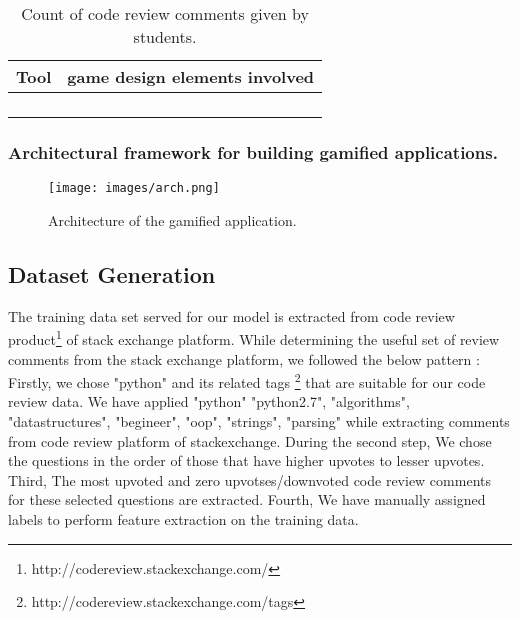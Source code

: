 \documentclass[conference]{IEEEtran}
\newcounter{magicrownumbers}
\newcommand\rownumber{\stepcounter{magicrownumbers}\arabic{magicrownumbers}}
\begin{document}
\begin{table}[ht]
\centering
\caption{Count of code review comments given by students.}
\begin{tabular}{|c|p{2cm}|c|} \hline
\multicolumn{2}{|c|}{Tool} & game design elements involved  \\ \hline
 \setcounter{magicrownumbers}{0}\rownumber & & \\
 \rownumber & & \\
 \rownumber & & \\
 \rownumber & & \\
 \hline
\end{tabular}
\label{tab:tools}
\end{table}

\subsubsection{Architectural framework for building gamified applications.}

\begin{figure}[ht]
\hspace{-6ex}
\centering
\texttt{[image: images/arch.png]}
\caption{Architecture of the gamified application.}
\label{fig:architecture}
\end{figure}

\subsection{Dataset Generation}
The training data set served for our model is extracted from code review product\footnote{http://codereview.stackexchange.com/} of stack exchange platform. While determining the useful set of review comments from the stack exchange platform, we followed the below pattern :
Firstly, we chose "python" and its related tags \footnote{http://codereview.stackexchange.com/tags} that are suitable for our code review data. We have applied "python" "python2.7", "algorithms", "datastructures", "begineer", "oop", "strings", "parsing" while extracting comments from code review platform of stackexchange. \newline During the second step, We chose the questions in the order of those that have higher upvotes to lesser upvotes. \newline Third, The most upvoted and zero upvotses/downvoted code review comments for these selected questions are extracted. \newline Fourth, We have manually assigned labels to perform feature extraction on the training data.
\end{document}
